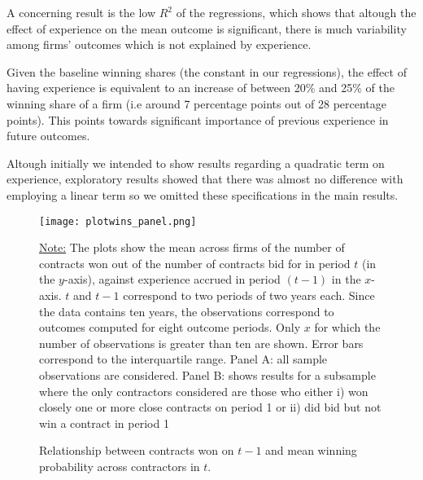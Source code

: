 A concerning result is the low $R^2$ of the regressions, which shows that altough the effect of experience on the mean outcome is significant, there is much variability among firms' outcomes which is not explained by experience.

Given the baseline winning shares (the constant in our regressions), the effect of having experience is equivalent to an increase of between 20\% and 25\% of the winning share of a firm (i.e around 7 percentage points out of 28 percentage points). This points towards significant importance of previous experience in future outcomes.

Altough initially we intended to show results regarding a quadratic term on experience, exploratory results showed that there was almost no difference with employing a linear term so we omitted these specifications in the main results.

\begin{figure}
  \texttt{[image: plotwins\_panel.png]}
  \caption{Relationship between contracts won on $t-1$ and mean winning probability across contractors in $t$.}
  \label{fig:plotresults_both}
  \vskip 0.5mm
  { \footnotesize \underline{Note:} The plots show the mean across firms of the number of contracts won out of the number of contracts bid for in period $t$ (in the $y$-axis), against experience accrued in period $(t-1)$ in the $x$-axis. $t$ and $t-1$ correspond to two periods of two years each. Since the data contains ten years, the observations correspond to outcomes computed for eight outcome periods.  Only $x$ for which the number of observations is greater than ten are shown. Error bars correspond to the interquartile range. Panel A: all sample observations are considered. Panel B:  shows results for a subsample where the only contractors considered are those who either i) won closely one or more close contracts  on period 1 or ii) did bid but not win a contract in period 1\par}
\end{figure}
\clearpage





\clearpage



